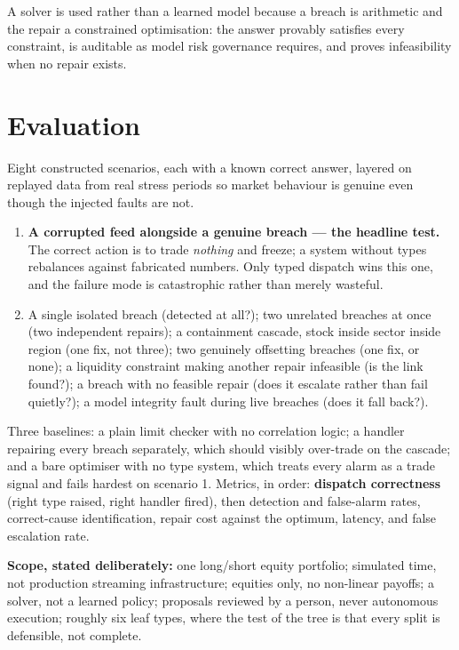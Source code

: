 \documentclass[11pt]{article}
\begin{document}
A solver is used rather than a learned model because a breach is arithmetic and the repair a
constrained optimisation: the answer provably satisfies every constraint, is auditable as model
risk governance requires, and proves infeasibility when no repair exists.

\section{Evaluation}

Eight constructed scenarios, each with a known correct answer, layered on replayed data from
real stress periods so market behaviour is genuine even though the injected faults are not.

\begin{enumerate}[leftmargin=*]
\item \textbf{A corrupted feed alongside a genuine breach --- the headline test.} The correct
  action is to trade \emph{nothing} and freeze; a system without types rebalances against
  fabricated numbers. Only typed dispatch wins this one, and the failure mode is catastrophic
  rather than merely wasteful.
\item A single isolated breach (detected at all?); two unrelated breaches at once (two
  independent repairs); a containment cascade, stock inside sector inside region (one fix, not
  three); two genuinely offsetting breaches (one fix, or none); a liquidity constraint making
  another repair infeasible (is the link found?); a breach with no feasible repair (does it
  escalate rather than fail quietly?); a model integrity fault during live breaches (does it
  fall back?).
\end{enumerate}

Three baselines: a plain limit checker with no correlation logic; a handler repairing every
breach separately, which should visibly over-trade on the cascade; and a bare optimiser with no
type system, which treats every alarm as a trade signal and fails hardest on scenario 1.
Metrics, in order: \textbf{dispatch correctness} (right type raised, right handler fired), then
detection and false-alarm rates, correct-cause identification, repair cost against the optimum,
latency, and false escalation rate.

\textbf{Scope, stated deliberately:} one long/short equity portfolio; simulated time, not
production streaming infrastructure; equities only, no non-linear payoffs; a solver, not a
learned policy; proposals reviewed by a person, never autonomous execution; roughly six leaf
types, where the test of the tree is that every split is defensible, not complete.
\end{document}
